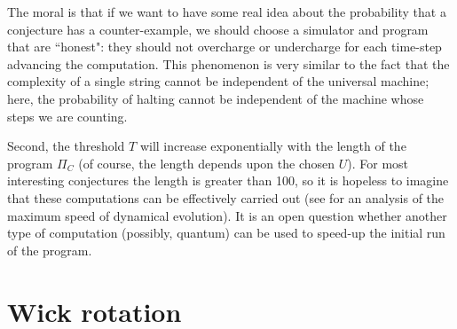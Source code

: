 \documentclass[12pt,twoside,openright]{report}
\begin{document}
The moral is that if we want to have some real idea about the probability that a conjecture has a counter-example, we should choose a simulator and program that are  ``honest":  they should not overcharge or undercharge for each time-step advancing the computation.  This phenomenon is very similar to the fact that the complexity of a single string cannot be independent of the universal machine; here, the probability of halting cannot be independent of the machine whose steps we are counting.

Second, the threshold $T$ will increase exponentially with the length of the program $\Pi_{C}$ (of course, the length depends upon the chosen $U$). For most interesting conjectures the length is greater than 100, so it is hopeless to imagine that these computations can be effectively carried out (see \cite{ml} for an analysis of the maximum speed of dynamical evolution). It is an open question whether another type of computation (possibly, quantum) can be used to speed-up the initial run of the program.

\section{Wick rotation}
\end{document}
